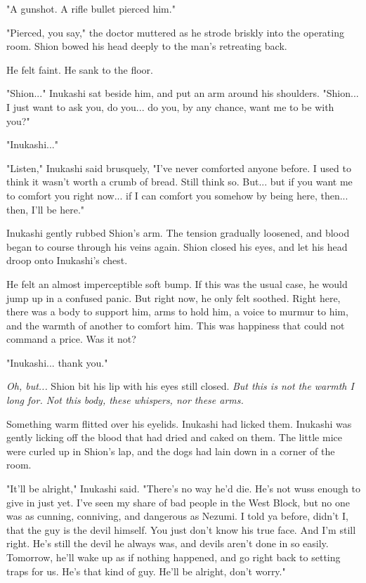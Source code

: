"A gunshot. A rifle bullet pierced him."

"Pierced, you say," the doctor muttered as he strode briskly into the
operating room. Shion bowed his head deeply to the man's retreating
back.

He felt faint. He sank to the floor.

"Shion..." Inukashi sat beside him, and put an arm around his shoulders.
"Shion... I just want to ask you, do you... do you, by any chance, want
me to be with you?"

"Inukashi..."

"Listen," Inukashi said brusquely, "I've never comforted anyone before.
I used to think it wasn't worth a crumb of bread. Still think so. But...
but if you want me to comfort you right now... if I can comfort you
somehow by being here, then... then, I'll be here."

Inukashi gently rubbed Shion's arm. The tension gradually loosened, and
blood began to course through his veins again. Shion closed his eyes,
and let his head droop onto Inukashi's chest.

He felt an almost imperceptible soft bump. If this was the usual case,
he would jump up in a confused panic. But right now, he only felt
soothed. Right here, there was a body to support him, arms to hold him,
a voice to murmur to him, and the warmth of another to comfort him. This
was happiness that could not command a price. Was it not?

"Inukashi... thank you."

\emph{Oh, but...} Shion bit his lip with his eyes still closed. \emph{But this is not
the warmth I long for. Not this body, these whispers, nor these arms.}

Something warm flitted over his eyelids. Inukashi had licked them.
Inukashi was gently licking off the blood that had dried and caked on
them. The little mice were curled up in Shion's lap, and the dogs had
lain down in a corner of the room.

"It'll be alright," Inukashi said. "There's no way he'd die. He's not
wuss enough to give in just yet. I've seen my share of bad people in the
West Block, but no one was as cunning, conniving, and dangerous as
Nezumi. I told ya before, didn't I, that the guy is the devil himself.
You just don't know his true face. And I'm still right. He's still the
devil he always was, and devils aren't done in so easily. Tomorrow,
he'll wake up as if nothing happened, and go right back to setting traps
for us. He's that kind of guy. He'll be alright, don't worry."

